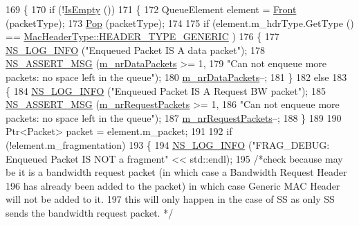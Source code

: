 \begin{DoxyCode}
169 \{
170   \textcolor{keywordflow}{if} (!\hyperlink{classns3_1_1WimaxMacQueue_a45fc4e6c31ac1789b8fdedf4a8714e12}{IsEmpty} ())
171     \{
172       QueueElement element = \hyperlink{classns3_1_1WimaxMacQueue_ab02b8007b7f0090eccaf01a3d3dc0b98}{Front} (packetType);
173       \hyperlink{classns3_1_1WimaxMacQueue_a35f80569dacb6e4b01ecadc4f3fa7dd4}{Pop} (packetType);
174 
175       \textcolor{keywordflow}{if} (element.m\_hdrType.GetType () == \hyperlink{classns3_1_1MacHeaderType_a54d8fc8bc93a2b7865627965cdd31c20a48fe5b2f20cadf78008c71469b518403}{MacHeaderType::HEADER\_TYPE\_GENERIC}
      )
176         \{
177           \hyperlink{group__logging_gafbd73ee2cf9f26b319f49086d8e860fb}{NS\_LOG\_INFO} (\textcolor{stringliteral}{"Enqueued Packet IS A data packet"});
178           \hyperlink{assert_8h_aff5ece9066c74e681e74999856f08539}{NS\_ASSERT\_MSG} (\hyperlink{classns3_1_1WimaxMacQueue_ac47e05e3e877edf7d7a3d2b5d20d514a}{m\_nrDataPackets} >= 1,
179                          \textcolor{stringliteral}{"Can not enqueue more packets: no space left in the queue"});
180           \hyperlink{classns3_1_1WimaxMacQueue_ac47e05e3e877edf7d7a3d2b5d20d514a}{m\_nrDataPackets}--;
181         \}
182       \textcolor{keywordflow}{else}
183         \{
184           \hyperlink{group__logging_gafbd73ee2cf9f26b319f49086d8e860fb}{NS\_LOG\_INFO} (\textcolor{stringliteral}{"Enqueued Packet IS A Request BW packet"});
185           \hyperlink{assert_8h_aff5ece9066c74e681e74999856f08539}{NS\_ASSERT\_MSG} (\hyperlink{classns3_1_1WimaxMacQueue_ad71c2599f50a2be15f7ce9abba5a539d}{m\_nrRequestPackets} >= 1,
186                          \textcolor{stringliteral}{"Can not enqueue more packets: no space left in the queue"});
187           \hyperlink{classns3_1_1WimaxMacQueue_ad71c2599f50a2be15f7ce9abba5a539d}{m\_nrRequestPackets}--;
188         \}
189 
190       Ptr<Packet> packet = element.m\_packet;
191 
192       \textcolor{keywordflow}{if} (!element.m\_fragmentation)
193         \{
194           \hyperlink{group__logging_gafbd73ee2cf9f26b319f49086d8e860fb}{NS\_LOG\_INFO} (\textcolor{stringliteral}{"FRAG\_DEBUG: Enqueued Packet IS NOT a fragment"} << std::endl);
195           \textcolor{comment}{/*check because may be it is a bandwidth request packet (in which case a Bandwidth Request Header}
196 \textcolor{comment}{            has already been added to the packet) in which case Generic MAC Header will not be added to it.}
197 \textcolor{comment}{            this will only happen in the case of SS as only SS sends the bandwidth request packet. */}

\end{DoxyCode}
